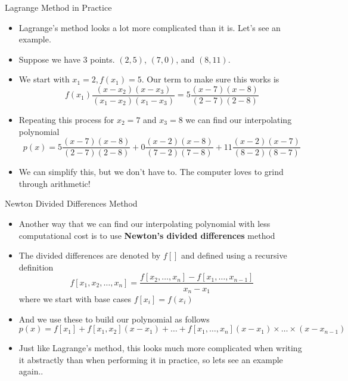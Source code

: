{}\documentclass[letterpaper,
compress,
xcolor=x11names,
]{beamer}
\begin{document}

\begin{frame}{Lagrange Method in Practice}
	\footnotesize
	\begin{itemize}
		\item Lagrange's method looks a lot more complicated than it is. Let's see an example.
		\item Suppose we have 3 points. $(2,5)$, $(7,0)$, and $(8,11)$.
		\item<2-> We start with $x_1 = 2, f(x_1) = 5$. Our term to make sure this works is 
		\begin{equation*}
			f(x_1)\frac{(x-x_2)(x-x_3)}{(x_1 - x_2)(x_1 - x_3)} = 5\frac{(x-7)(x-8)}{(2-7)(2-8)}
		\end{equation*}
		\item<2-> Repeating this process for $x_2 = 7$ and $x_3 = 8$ we can find our interpolating polynomial
		\begin{equation*}
			p(x) = 5\frac{(x-7)(x-8)}{(2-7)(2-8)} + 0\frac{(x-2)(x-8)}{(7-2)(7-8)} + 11\frac{(x-2)(x-7)}{(8-2)(8-7)}
		\end{equation*}
		\item<3-> We can simplify this, but we don't have to. The computer loves to grind through arithmetic!
	\end{itemize}
\end{frame}



\begin{frame}{Newton Divided Differences Method}
	\footnotesize
	\begin{itemize}
		\item Another way that we can find our interpolating polynomial with less computational cost is to use \textbf{Newton's divided differences} method
		\item<2-> The divided differences are denoted by $f[]$ and defined using a recursive definition
		\begin{equation*}
			f[x_1, x_2, \dots, x_n] = \frac{f[x_2,\dots,x_n] - f[x_1,\dots,x_{n-1}]}{x_n - x_1}
		\end{equation*}
		where we start with base cases $f[x_i] = f(x_i)$
		\item<3-> And we use these to build our polynomial as follows
		\begin{equation*}
			p(x) = f[x_1] + f[x_1,x_2](x-x_1) + \dots + f[x_1,\dots,x_n](x-x_1)\times\dots\times(x-x_{n-1})
		\end{equation*}
		\item<4-> Just like Lagrange's method, this looks much more complicated when writing it abstractly than when performing it in practice, so lets see an example again..
	\end{itemize}
\end{frame}
\end{document}
